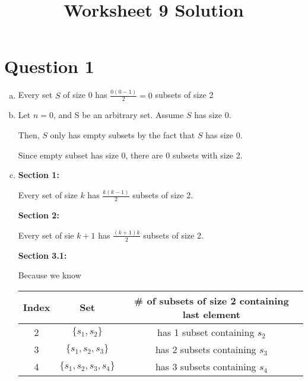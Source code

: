 \documentclass[12pt]{article}
\begin{document}
\title{Worksheet 9 Solution}
\maketitle

\section*{Question 1}
\begin{enumerate}[a.]
    \item

    Every set $S$ of size 0 has $\frac{0(0-1)}{2} = 0$ subsets of size 2

    \item

    Let $n = 0$, and S be an arbitrary set. Assume $S$ has size 0.

    \bigskip

    Then, $S$ only has empty subsets by the fact that $S$ has size 0.

    \bigskip

    Since empty subset has size 0, there are 0 subsets with size 2.

    \item

    \textbf{Section 1:}

    \bigskip

    Every set of size $k$ has $\frac{k(k-1)}{2}$ subsets of size 2.

    \bigskip

    \textbf{Section 2:}

    \bigskip

    Every set of sie $k+1$ has $\frac{(k+1)k}{2}$ subsets of size 2.

    \bigskip

    \textbf{Section 3.1:}

    \bigskip

    Because we know

    \begin{tabular}{c | c | c}
        Index & Set & \# of subsets of size 2 containing last element\\
        \hline
        2 & $\{s_1,s_2\}$ & has 1 subset containing $s_2$\\
        \hline
        3 & $\{s_1,s_2,s_3\}$ & has 2 subsets containing $s_3$\\
        \hline
        4 & $\{s_1,s_2,s_3,s_4\}$ & has 3 subsets containing $s_4$
    \end{tabular}


\end{enumerate}
\end{document}
